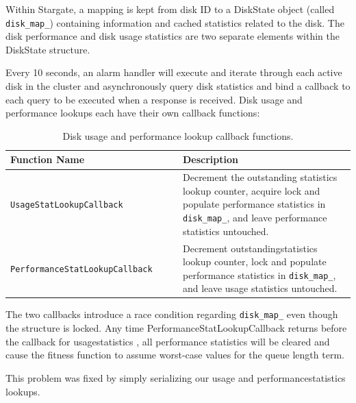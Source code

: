 \documentclass[12pt]{article}
\begin{document}
\begin{appendices}
  Within Stargate, a mapping is kept from disk ID to a DiskState object (called
  \texttt{disk\_map\_}) containing information and cached statistics related to
  the disk. The disk performance and disk usage statistics are two separate
  elements within the DiskState structure.

  Every 10 seconds, an alarm handler will execute and iterate through each
  active disk in the cluster and asynchronously query disk statistics and bind a
  callback to each query to be executed when a response is received. Disk usage
  and performance lookups each have their own callback functions:

  \begin{table}[htbp]
    \caption{Disk usage and performance lookup callback functions.}
    \begin{center}
    \begin{tabular}{ | p{0.5\linewidth} | p{0.5\linewidth} | }
      \hline
      \textbf{Function Name} & \textbf{Description} \\ \hline
      \verb|UsageStatLookupCallback| & Decrement the outstanding statistics lookup
                                       counter, acquire lock and populate
                                       performance statistics in
                                       \texttt{disk\_map\_}, and leave
                                       performance statistics untouched.
                                       \\ \hline

      \verb|PerformanceStatLookupCallback| & Decrement outstandingstatistics 
                                             lookup counter, lock and
                                             populate performance statistics in
                                             \texttt{disk\_map\_}, and leave
                                             usage statistics untouched. \\ \hline

      \hline
    \end{tabular}
    \end{center}
  \end{table}

  The two callbacks introduce a race condition regarding \texttt{disk\_map\_}
  even though the structure is locked. Any time PerformanceStatLookupCallback
  returns before the callback for usagestatistics , all performance statistics will be
  cleared and cause the fitness function to assume worst-case values for the
  queue length term.

  This problem was fixed by simply serializing our usage and
  performancestatistics 
  lookups.

\end{appendices}
\end{document}
